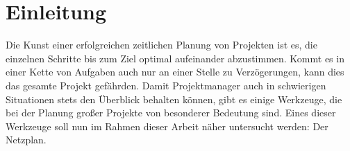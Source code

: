 \chapter{Einleitung}
\label{Einleitung}

Die Kunst einer erfolgreichen zeitlichen Planung von Projekten ist es, die
einzelnen Schritte bis zum Ziel optimal aufeinander abzustimmen. Kommt
es in einer Kette von Aufgaben auch nur an einer Stelle zu
Verz\"ogerungen, kann dies das gesamte Projekt gef\"ahrden. Damit
Projektmanager auch in schwierigen Situationen stets den \"Uberblick
behalten k\"onnen, gibt es einige Werkzeuge, die bei der Planung gro{\ss}er
Projekte von besonderer Bedeutung sind. Eines dieser Werkzeuge soll
nun im Rahmen dieser Arbeit n\"aher untersucht werden: Der Netzplan.
